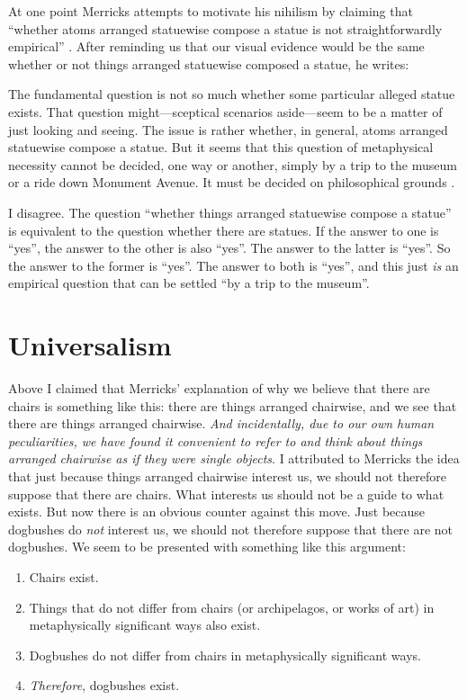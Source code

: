 \documentclass[11pt]{article}
\newenvironment{squote}{%
\begin{spacing}{1}
       	\begin{list}{}{%
\setlength{\labelwidth}{0pt}%
\rightmargin\leftmargin%
}
\item\relax
}{%
\end{list}%
\end{spacing}
}
\begin{document}
\begin{spacing}{1.25}
At one point Merricks attempts to motivate his nihilism by claiming
that ``whether atoms arranged statuewise compose a statue is not
straightforwardly empirical'' \citeyearpar[9]{merricks2001a}.  After
reminding us that our visual evidence would be the same whether or not
things arranged statuewise composed a statue, he writes:

\begin{squote}
The fundamental question is not so much whether some particular
alleged statue exists.  That question might---sceptical scenarios
aside---seem to be a matter of just looking and seeing.  The issue is
rather whether, in general, atoms arranged statuewise compose a
statue.  But it seems that this question of metaphysical necessity
cannot be decided, one way or another, simply by a trip to the museum
or a ride down Monument Avenue.  It must be decided on philosophical
grounds \citeyearpar[9]{merricks2001a}.
\end{squote}

I disagree.  The question ``whether things arranged statuewise compose
a statue'' is equivalent to the question whether there are statues.
If the answer to one is ``yes'', the answer to the other is also
``yes''.  The answer to the latter is ``yes''.  So the answer to the
former is ``yes''.  The answer to both is ``yes'', and this just {\em
  is} an empirical question that can be settled ``by a trip to the
museum''.

\section{Universalism}
\label{universalism}
Above I claimed that Merricks' explanation of why we believe that
there are chairs is something like this: there are things arranged
chairwise, and we see that there are things arranged chairwise.  {\em
  And incidentally, due to our own human peculiarities, we have found
  it convenient to refer to and think about things arranged chairwise
  as if they were single objects}.  I attributed to Merricks the idea
that just because things arranged chairwise interest us, we should not
therefore suppose that there are chairs.  What interests us should not
be a guide to what exists.  But now there is an obvious counter
against this move.  Just because dogbushes do {\em not} interest us,
we should not therefore suppose that there are not dogbushes.  We seem
to be presented with something like this argument:

\begin{enumerate}[ref=(\arabic*)]
  \item Chairs exist. \label{u-1}
  \item Things that do not differ from chairs (or archipelagos, or
    works of art) in metaphysically significant ways also exist.
  \item Dogbushes do not differ from chairs in metaphysically
    significant ways.
  \item {\em Therefore}, dogbushes exist. \label{u-4}
\end{enumerate}


\end{spacing}
\end{document}
